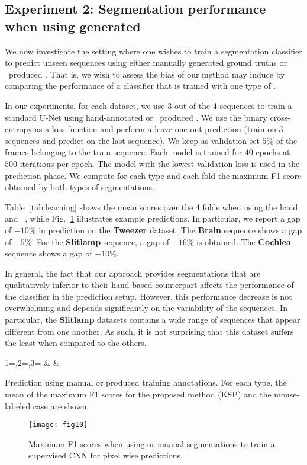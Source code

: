 \subsection{Experiment 2: Segmentation performance when using generated }
We now investigate the setting where one wishes to train a segmentation classifier to predict unseen sequences using either manually generated ground truths or \KSP ~produced . That is, we wish to assess the bias of our method may induce by comparing the performance of a classifier that is trained with one type of .

In our experiments, for each dataset, we use 3 out of the 4 sequences to train a standard U-Net using hand-annotated or \KSP ~produced . We use the binary cross-entropy as a loss function and perform a leave-one-out prediction (\ie train on $3$ sequences and predict on the last sequence). We keep as validation set $5\%$ of the frames belonging to the train sequence. Each model is trained for $40$ epochs at $500$ iterations per epoch. The model with the lowest validation loss is used in the prediction phase. We compute for each type and each fold the maximum F1-score obtained by both types of segmentations.

Table~\ref{tab:learning} shows the mean scores over the 4 folds when using the hand and \KSP ~, while Fig.~\ref{fig:learning} illustrates example predictions. In particular, we report a gap of $-10\%$ in prediction on the {\bf Tweezer} dataset. The {\bf Brain} sequence shows a gap of $-5\%$. For the {\bf Slitlamp} sequence, a gap of $-16\%$ is obtained. The {\bf Cochlea} sequence shows a gap of $-10\%$.

In general, the fact that our approach provides segmentations that are qualitatively inferior to their hand-based counterpart affects the performance of the classifier in the prediction setup. However, this performance decrease is not overwhelming and depends significantly on the variability of the sequences. In particular, the {\bf Slitlamp} datasets contains a wide range of sequences that appear different from one another. As such, it is not surprising that this dataset suffers the least when compared to the others. 
\begin{table}[h]
\centering
{}
  {1=\type,2=\sksp,3=\smouse}
  {\type & \sksp & \smouse }
\caption{Prediction using manual or produced training annotations. For each type, the mean of the maximum F1 scores for the proposed method (KSP) and the mouse-labeled case are shown.}\label{tab:learning}
\end{table}
\begin{figure}[h]
\centering
\texttt{[image: fig10]}
\caption{Maximum F1 scores when using \KSPnb or manual segmentations to train a supervised CNN for pixel wise predictions.}
\label{fig:learning}
\end{figure}

